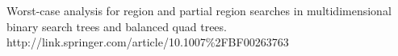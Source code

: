 \begin{thebibliography}{99}
Worst-case analysis for region and partial region searches in multidimensional binary search trees and balanced quad trees.\\
http://link.springer.com/article/10.1007\%2FBF00263763


\end{thebibliography}